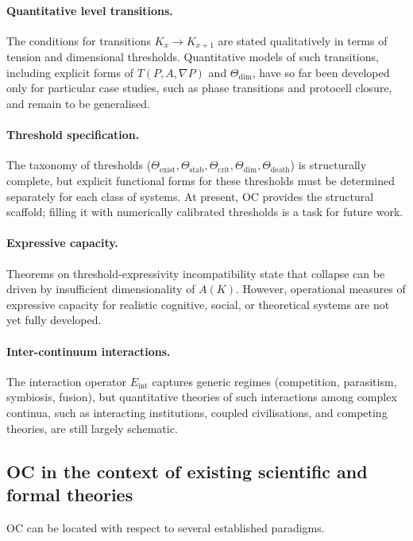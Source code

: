 \paragraph{Quantitative level transitions.}
The conditions for transitions \(K_x \to K_{x+1}\) are stated qualitatively in terms of tension and dimensional thresholds.
Quantitative models of such transitions, including explicit forms of \(T(P,A,\nabla P)\) and \(\Theta_{\mathrm{dim}}\), have so far been developed only for particular case studies, such as phase transitions and protocell closure, and remain to be generalised.

\paragraph{Threshold specification.}
The taxonomy of thresholds (\(\Theta_{\mathrm{exist}}, \Theta_{\mathrm{stab}}, \Theta_{\mathrm{crit}}, \Theta_{\mathrm{dim}}, \Theta_{\mathrm{death}}\)) is structurally complete, 
but explicit functional forms for these thresholds must be determined separately for each class of systems.
At present, OC provides the structural scaffold; filling it with numerically calibrated thresholds is a task for future work.

\paragraph{Expressive capacity.}
Theorems on threshold-expressivity incompatibility state that collapse can be driven by insufficient dimensionality of \(A(K)\).
However, operational measures of expressive capacity for realistic cognitive,
social, or theoretical systems are not yet fully developed.

\paragraph{Inter-continuum interactions.}
The interaction operator \(E_{\mathrm{int}}\) captures generic regimes (competition, parasitism, symbiosis, fusion), but quantitative theories of such interactions among complex continua, such as interacting institutions, coupled civilisations, and competing theories, are still largely schematic.

\subsection{OC in the context of existing scientific and formal theories}

OC can be located with respect to several established paradigms.

